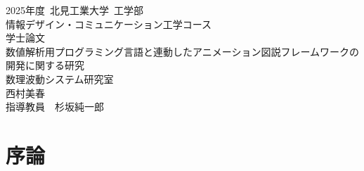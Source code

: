 \documentclass[a4paper,11pt,openany]{ltjsbook}
\begin{document}

\renewcommand{\lstlistingname}{ソースコード}

\thispagestyle{empty}

\begin{center}
 {\LARGE
 \vspace*{5cm}
 {\huge{2025年度\ 北見工業大学\ 工学部}}\\
 {\huge{情報デザイン・コミュニケーション工学コース}}\\
 {\huge{学士論文}}\\
 \vspace{2cm}
 {\Huge{数値解析用プログラミング言語と連動したアニメーション図説フレームワークの開発に関する研究}}\\
 \vspace{6cm}
 {\huge 数理波動システム研究室}\\
 {\huge 西村美春}\\
 {\huge 指導教員\ \ 杉坂純一郎}\\
 }
\end{center}


\newpage
\thispagestyle{empty}
\begin{center}
 \vspace{2cm}
\end{center}

\frontmatter

\tableofcontents

\mainmatter

\chapter{序論}

\end{document}
